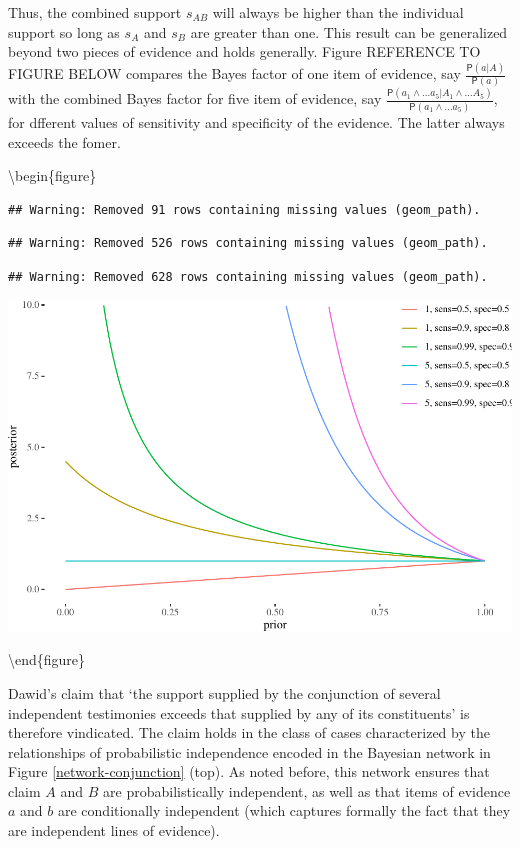 \documentclass[10pt,dvipsnames,enabledeprecatedfontcommands]{scrartcl}
\newcommand{\pr}[1]{\mathsf{P}(#1)}
\begin{document}
\noindent  Thus, the combined support \(s_{AB}\) will always be higher
than the individual support so long as \(s_{A}\) and \(s_{B}\) are
greater than one. This result can be generalized beyond two pieces of
evidence and holds generally. Figure REFERENCE TO FIGURE BELOW compares
the Bayes factor of one item of evidence, say
\(\frac{\pr{a \vert A}}{\pr{a}}\) with the combined Bayes factor for
five item of evidence, say
\(\frac{\pr{a_1 \wedge \dots a_5 \vert A_1 \wedge \dots A_5}}{\pr{a_1\wedge \dots a_5}}\),
for dfferent values of sensitivity and specificity of the evidence. The
latter always exceeds the fomer.

\textbackslash{}begin\{figure\}

\begin{verbatim}
## Warning: Removed 91 rows containing missing values (geom_path).
\end{verbatim}

\begin{verbatim}
## Warning: Removed 526 rows containing missing values (geom_path).
\end{verbatim}

\begin{verbatim}
## Warning: Removed 628 rows containing missing values (geom_path).
\end{verbatim}

\begin{center}\includegraphics[width=0.9\linewidth]{conjunction-paradox_files/figure-latex/unnamed-chunk-6-1} \end{center}

\textbackslash{}end\{figure\}

Dawid's claim that `the support supplied by the conjunction of several
independent testimonies exceeds that supplied by any of its
constituents' is therefore vindicated. The claim holds in the class of
cases characterized by the relationships of probabilistic independence
encoded in the Bayesian network in Figure \ref{network-conjunction}
(top). As noted before, this network ensures that claim \(A\) and \(B\)
are probabilistically independent, as well as that items of evidence
\(a\) and \(b\) are conditionally independent (which captures formally
the fact that they are independent lines of evidence).
\end{document}
